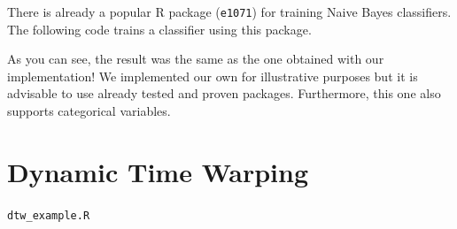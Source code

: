 \documentclass[
  11pt,
]{krantz}
\makeatletter
\newenvironment{Shaded}{\begin{snugshade}}{\end{snugshade}}
\newcommand{\CommentTok}[1]{\textcolor[rgb]{0.37,0.37,0.37}{\textit{#1}}}
\newcommand{\DocumentationTok}[1]{\textcolor[rgb]{0.37,0.37,0.37}{\textbf{\textit{#1}}}}
\newcommand{\FunctionTok}[1]{\textcolor[rgb]{0,0,0}{#1}}
\newcommand{\NormalTok}[1]{#1}
\newcommand{\OtherTok}[1]{\textcolor[rgb]{0.37,0.37,0.37}{#1}}
\newcommand{\SpecialCharTok}[1]{\textcolor[rgb]{0,0,0}{#1}}
\newcommand{\StringTok}[1]{\textcolor[rgb]{0.5,0.5,0.5}{#1}}
\newenvironment{kframe}{%
\medskip{}
\setlength{\fboxsep}{.8em}
 \def\at@end@of@kframe{}%
 \ifinner\ifhmode%
  \def\at@end@of@kframe{\end{minipage}}%
  \begin{minipage}{\columnwidth}%
 \fi\fi%
 \def\FrameCommand##1{\hskip\@totalleftmargin \hskip-\fboxsep
 \colorbox{shadecolor}{##1}\hskip-\fboxsep
     \hskip-\linewidth \hskip-\@totalleftmargin \hskip\columnwidth}%
 \MakeFramed {\advance\hsize-\width
   \@totalleftmargin\z@ \linewidth\hsize
   \@setminipage}}%
 {\par\unskip\endMakeFramed%
 \at@end@of@kframe}
\newenvironment{rmdblock}[1]
  {
  \begin{itemize}
  \renewcommand{\labelitemi}{
    \raisebox{-.7\height}[0pt][0pt]{
      {\setkeys{Gin}{width=3em,keepaspectratio}\texttt{[image: images/icons/\#1]}}
    }
  }
  \setlength{\fboxsep}{1em}
  \begin{kframe}
  \item
  }
  {
  \end{kframe}
  \end{itemize}
  }
\newenvironment{rmdfolder}
  {\begin{rmdblock}{folder}}
  {\end{rmdblock}}
\makeatother
\begin{document}
There is already a popular R package (\texttt{e1071}) for training Naive Bayes classifiers. The following code trains a classifier using this package.

\begin{Shaded}
\end{Shaded}

As you can see, the result was the same as the one obtained with our implementation! We implemented our own for illustrative purposes but it is advisable to use already tested and proven packages. Furthermore, this one also supports categorical variables.

\hypertarget{dynamic-time-warping}{%
\section{Dynamic Time Warping}\label{dynamic-time-warping}}

\begin{rmdfolder}
\texttt{dtw\_example.R}
\end{rmdfolder}
\end{document}
